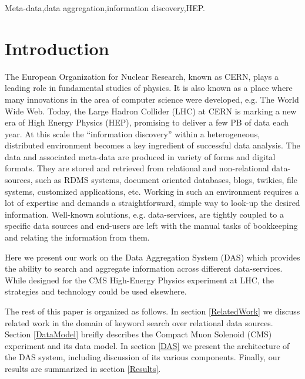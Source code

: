 \documentclass[3p,times]{elsarticle}
\begin{document}
\begin{frontmatter}
\begin{keyword}
Meta-data\sep data aggregation\sep information discovery\sep HEP.


\end{keyword}

\end{frontmatter}


\section{Introduction}
The European Organization for Nuclear Research, known as CERN, plays a leading
role in fundamental studies of physics. It is also known as a place where
many innovations in the area of computer science were developed, e.g. The World Wide Web.
Today, the Large Hadron Collider (LHC) at CERN is marking a new era of High Energy
Physics (HEP), promising to deliver a few PB of data each year. 
At this scale the ``information discovery'' within a heterogeneous, distributed 
environment becomes a key ingredient of successful data analysis.
The data and associated meta-data are produced in variety of forms and digital formats.
They are stored and retrieved from relational and non-relational data-sources, such as 
RDMS systems, document oriented databases, blogs, twikies, file systems,
customized applications, etc. Working in such an environment requires a lot 
of expertise and demands a straightforward, simple
way to look-up the desired information.
Well-known solutions, e.g. data-services, are tightly coupled to a specific data 
sources and end-users are left with the manual tasks of bookkeeping and 
relating the information from them.

Here we present our work on the Data Aggregation System (DAS) which provides
the ability to search and aggregate information across different 
data-services. While designed for the CMS High-Energy Physics 
experiment at LHC, the strategies and technology could be
used elsewhere. 

The rest of this paper is organized as follows. 
In section \ref{RelatedWork} we discuss related work in the domain of 
keyword search over relational data sources.
Section \ref{DataModel} breifly describes the Compact Muon Solenoid (CMS) experiment 
and its data model. In section \ref{DAS} we present the architecture 
of the DAS system, including discussion of its
various components. Finally, our results are summarized in section \ref{Results}.
\end{document}

